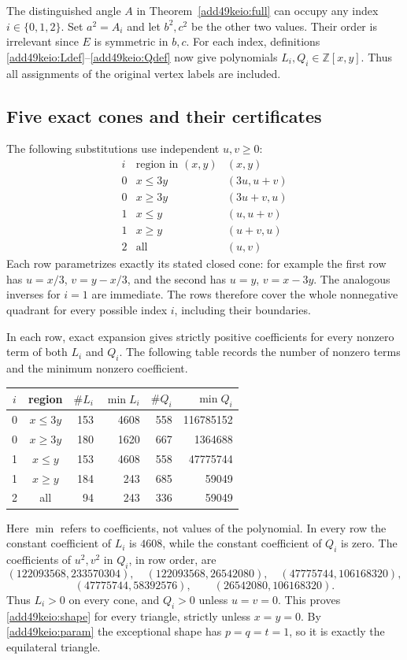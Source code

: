 \documentclass[11pt,a4paper]{article}
\numberwithin{equation}{section}
\theoremstyle{definition}
\theoremstyle{remark}
\begin{document}
The distinguished angle $A$ in Theorem~\ref{add49keio:full} can occupy any
index $i\in\{0,1,2\}$. Set $a^2=A_i$ and let $b^2,c^2$ be the
other two values. Their order is irrelevant since $E$ is symmetric in
$b,c$. For each index, definitions \eqref{add49keio:Ldef}--\eqref{add49keio:Qdef} now
give polynomials $L_i,Q_i\in\mathbb Z[x,y]$. Thus all assignments
of the original vertex labels are included.

\subsection{Five exact cones and their certificates}

The following substitutions use independent $u,v\ge0$:
\[
\begin{array}{c|c|c}
 i&\text{region in }(x,y)&(x,y)\\\hline
 0&x\le3y&(3u,u+v)\\
 0&x\ge3y&(3u+v,u)\\
 1&x\le y&(u,u+v)\\
 1&x\ge y&(u+v,u)\\
 2&\text{all}&(u,v)
\end{array}
\]
Each row parametrizes exactly its stated closed cone: for example the
first row has $u=x/3$, $v=y-x/3$, and the second has $u=y$,
$v=x-3y$. The analogous inverses for $i=1$ are immediate.
The rows therefore cover the whole nonnegative quadrant for every
possible index $i$, including their boundaries.

In each row, exact expansion gives strictly positive coefficients for
every nonzero term of both $L_i$ and $Q_i$. The following table records
the number of nonzero terms and the minimum nonzero coefficient.
\begin{center}
\begin{tabular}{ccrrrr}
\toprule
$i$&region&$\#L_i$&$\min L_i$&$\#Q_i$&$\min Q_i$\\
\midrule
0&$x\le3y$&153&4608&558&116785152\\
0&$x\ge3y$&180&1620&667&1364688\\
1&$x\le y$&153&4608&558&47775744\\
1&$x\ge y$&184&243&685&59049\\
2&all&94&243&336&59049\\
\bottomrule
\end{tabular}
\end{center}
Here $\min$ refers to coefficients, not values of the polynomial.
In every row the constant coefficient of $L_i$ is $4608$, while the
constant coefficient of $Q_i$ is zero. The coefficients of $u^2,v^2$
in $Q_i$, in row order, are
\[
 (122093568,233570304),\quad (122093568,26542080),\quad
 (47775744,106168320),
\]
\[
 (47775744,58392576),\qquad (26542080,106168320).
\]
Thus $L_i>0$ on every cone, and $Q_i>0$ unless $u=v=0$.
This proves \eqref{add49keio:shape} for every triangle, strictly unless
$x=y=0$. By \eqref{add49keio:param} the exceptional shape has
$p=q=t=1$, so it is exactly the equilateral triangle.
\end{document}
